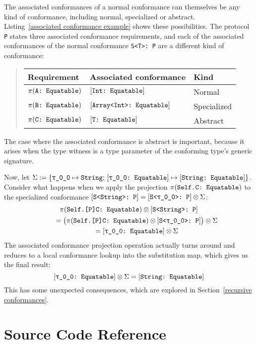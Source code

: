 \documentclass[../generics]{subfiles}
\begin{document}
\begin{example}
The associated conformances of a normal conformance can themselves be any kind of conformance, including normal, specialized or abstract. Listing~\ref{associated conformance example} shows these possibilities. The protocol \texttt{P} states three associated conformance requirements, and each of the associated conformances of the normal conformance \verb|S<T>: P| are a different kind of conformance:
\begin{quote}
\begin{tabular}{lll}
\toprule
\textbf{Requirement}&\textbf{Associated conformance}&\textbf{Kind}\\
\midrule
$\pi(\texttt{A:~Equatable})$&$[\texttt{Int:~Equatable}]$&Normal\\
$\pi(\texttt{B:~Equatable})$&$[\texttt{Array<Int>:~Equatable}]$&Specialized\\
$\pi(\texttt{C:~Equatable})$&$[\texttt{T:~Equatable}]$&Abstract\\
\bottomrule
\end{tabular}
\end{quote}
The case where the associated conformance is abstract is important, because it arises when the type witness is a type parameter of the conforming type's generic signature.

Now, let $\Sigma:=\{\texttt{\texttt{$\uptau$\_0\_0}} \mapsto \texttt{String};\,[\texttt{\texttt{$\uptau$\_0\_0}:~Equatable}] \mapsto [\texttt{String:~Equatable}]\}$.
Consider what happens when we apply the projection $\pi(\texttt{Self.C:~Equatable})$ to the specialized conformance $[\texttt{S<String>:~P}]=[\texttt{S<\texttt{$\uptau$\_0\_0}>:~P}]\otimes\Sigma$:
\begin{gather*}
\pi(\texttt{Self.[P]C:~Equatable}) \otimes [\texttt{S<String>:~P}]\\
\qquad {} = \bigl(\pi(\texttt{Self.[P]C:~Equatable}) \otimes[\texttt{S<\texttt{$\uptau$\_0\_0}>:~P}]\bigr)\otimes\Sigma\\
\qquad {} = [\texttt{\texttt{$\uptau$\_0\_0}:~Equatable}] \otimes\Sigma
\end{gather*}
The associated conformance projection operation actually turns around and reduces to a local conformance lookup into the substitution map, which gives us the final result:
\[[\texttt{\texttt{$\uptau$\_0\_0}:~Equatable}] \otimes \Sigma = [\texttt{String:~Equatable}]\]
This has some unexpected consequences, which are explored in Section~\ref{recursive conformances}.
\end{example}

\section{Source Code Reference}\label{conformancesourceref}
\end{document}
